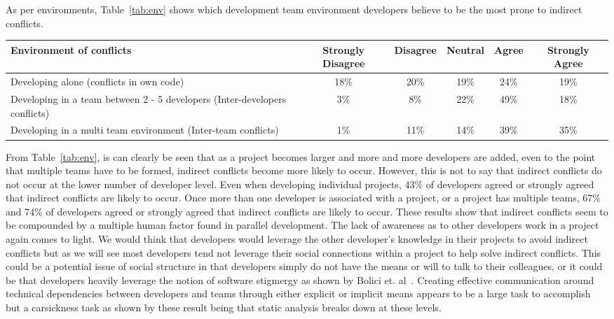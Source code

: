 \documentclass[conference]{IEEEtran}
\begin{document}
As per environments, Table~\ref{tab:env} shows which development team environment developers believe to be the most
prone to indirect conflicts.

\begin{table*}[tb!]
\begin{center}
\begin{tabular}{| p{7cm} | c | c | c | c | c |}
\hline
Environment of conflicts & Strongly Disagree & Disagree & Neutral & Agree & Strongly Agree \\
\hline
\hline
Developing alone (conflicts in own code) & 18\% & 20\% & 19\% & 24\% & 19\% \\ \hline
Developing in a team between 2 - 5 developers (Inter-developers conflicts) & 3\% & 8\% & 22\% & 49\% & 18\% \\ \hline
Developing in a multi team environment (Inter-team conflicts) & 1\% & 11\% & 14\% & 39\% & 35\% \\ \hline
\end{tabular}
\end{center}
\caption{Results of survey questions to development environments in which indirect conflicts are likely to occur, in terms of percentage
of developers surveyed.\label{tab:env}}
\end{table*}

From Table~\ref{tab:env}, is can clearly be seen that as a project becomes larger and more and more developers are added, even to the point
that multiple teams have to be formed, indirect conflicts become more likely to occur. However, this is not to say that indirect conflicts
do not occur at the lower number of developer level. Even when developing individual projects, 43\% of developers agreed or strongly agreed
that indirect conflicts are likely to occur. Once more than one developer is associated with a project, or a project has multiple teams, 
67\% and 74\% of developers agreed or strongly agreed that indirect conflicts are likely to occur. These results show that indirect conflicts
seem to be compounded by a multiple human factor found in parallel development. The lack of awareness as to other developers work in a project 
again comes to light. We would think that developers would leverage the other developer's knowledge in their projects to avoid indirect conflicts
but as we will see most developers tend not leverage their social connections within a project to help solve indirect conflicts. This could be
a potential issue of social structure in that developers simply do not have the means or will to talk to their colleagues, or it could be that
developers heavily leverage the notion of software stigmergy as shown by Bolici et. al~\cite{Bolici:2009}. Creating effective communication around
technical dependencies between developers and teams through either explicit or implicit means appears to be a large task to accomplish but a
carsickness task as shown by these result being that static analysis breaks down at these levels.
\end{document}
